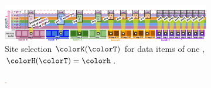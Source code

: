 \begin{figure}[htbp!]
  \centering
  \begin{subfigure}[b]{\linewidth}
    \includegraphics[width=\textwidth, trim={0cm 0cm 0.3cm 1cm}, clip]{img/hsurf-steady-intuition}
    \vspace{-4.5ex}
    \caption{\footnotesize Site selection $\colorK(\colorT)$ for data items of one \hv{}, $\colorH(\colorT) = \colorh$.}
    \label{fig:hsurf-steady-intuition-diagram}
  \end{subfigure}
  \begin{subfigure}[b]{\linewidth}
    \includegraphics[width=0.011\textwidth, trim={0.2cm 2.8cm 31.8cm 2.8cm}, clip]{binder/teeplots/11/reservation-mode=steady+surface-size=32+viz=site-reservation-at-ranks-heatmap+ext=}%
\end{subfigure}
\end{figure}
